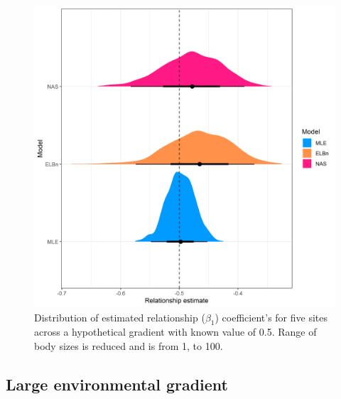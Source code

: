 \documentclass[
]{article}
\begin{document}
\begin{figure}
\centering
\includegraphics{figures/PLB_small_m_relationship_density.png}
\caption{Distribution of estimated relationship (\(\beta_1\))
coefficient's for five sites across a hypothetical gradient with known
value of 0.5. Range of body sizes is reduced and is from 1, to 100.}
\end{figure}

\newpage

\hypertarget{large-environmental-gradient}{%
\subsection{Large environmental
gradient}\label{large-environmental-gradient}}
\end{document}
